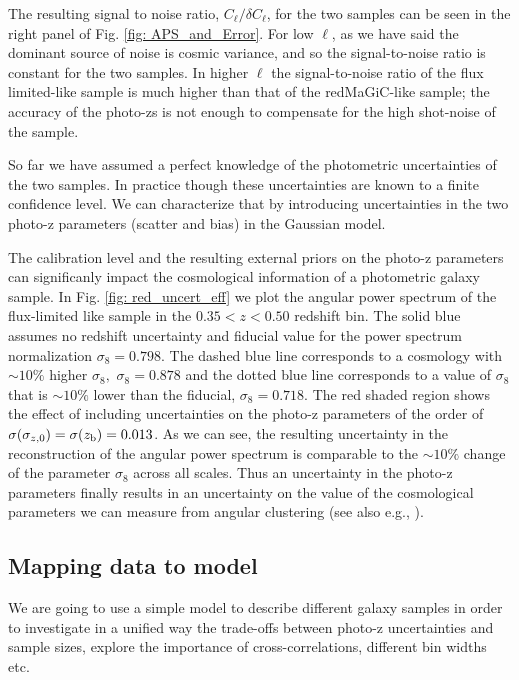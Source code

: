\documentclass[a4paper,fleqn,usenatbib]{mnras}
\begin{document}
The resulting signal to noise ratio, $C_\ell/\delta C_\ell$,  for the two samples can be seen in the right panel of Fig. \ref{fig: APS_and_Error}. For low $\ell$, as we have said the dominant source of noise is cosmic variance, and so the signal-to-noise ratio is constant for the two samples. In higher $\ell$ the signal-to-noise ratio of the flux limited-like sample is much higher than that of the  redMaGiC-like sample; the accuracy of the photo-zs is not enough to compensate for the high shot-noise of the sample. 

So far we have assumed a perfect knowledge of the photometric uncertainties of the two samples. In practice though these uncertainties are known to a finite confidence level. We can characterize that by introducing uncertainties in the two photo-z parameters (scatter and bias) in the Gaussian model. 

The calibration level and the resulting external priors on the photo-z parameters can significanly impact the cosmological information of a photometric galaxy sample. In Fig. \ref{fig: red_uncert_eff} we plot the angular power spectrum of the flux-limited like sample in the $0.35 < z < 0.50$ redshift bin. The solid blue assumes no redshift uncertainty and fiducial value for the power spectrum normalization $\sigma_8 = 0.798$.  The dashed blue line corresponds to a cosmology with $ \sim 10\%$ higher $\sigma_8 , \,\, \sigma_8 = 0.878$ and the dotted blue line corresponds to a value of $\sigma_8$ that is $\sim 10\%$ lower than the fiducial, $\sigma_8 = 0.718$. The red shaded region shows the effect of including uncertainties on the photo-z parameters of the order of $\sigma(\sigma_{z,0}) = \sigma(z_{\mbox{\scriptsize{b}}}) = 0.013$. As we can see, the resulting uncertainty in the reconstruction of the angular power spectrum is comparable to the $\sim 10\%$ change of the parameter $\sigma_8$ across all scales. Thus an uncertainty in the photo-z parameters finally results  in an uncertainty on the value of the cosmological parameters we can measure from angular clustering (see also e.g., \citealt{Hearin2012}).
 




\subsection{Mapping data to model}


We are going to use a simple model to describe different galaxy samples in order to investigate in a unified way the trade-offs between photo-z uncertainties and sample sizes, explore the importance of cross-correlations, different bin widths etc. 
\end{document}
